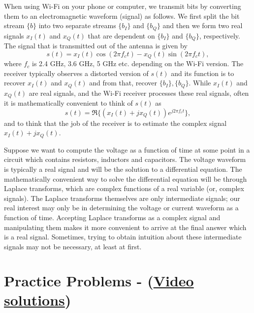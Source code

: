 \begin{example}
When using Wi-Fi on your phone or computer, we transmit bits by converting them
to an electromagnetic waveform (signal) as follows.
We first split the bit stream $\{b\}$ into two separate streams $\{b_I\}$ and $\{b_Q\}$ and then we form two real signals
$x_I(t)$ and $x_Q(t)$ that are dependent on $\{b_I\}$ and $\{b_Q\}$, respectively.
The signal that is transmitted out of the antenna is given by
\[
s(t) = x_I(t) \cos(2 \pi f_c t) - x_Q(t) \sin (2 \pi f_c t),
\]
where $f_c$ is 2.4 GHz, 3.6 GHz, 5 GHz etc. depending on the Wi-Fi version.
The receiver typically observes a distorted version of $s(t)$ and its function is to recover $x_I(t)$ and $x_Q(t)$
and from that, recover $\{b_I\}, \{b_Q\}$.
While $x_I(t)$ and $x_Q(t)$ are real signals,
and the Wi-Fi receiver processes these real signals,
often it is mathematically convenient to think of $s(t)$ as
\[
s(t) = \Re\{(x_I(t)+jx_Q(t)) e^{j 2 \pi f_c t} \},
\]
and to think that the job of the receiver is to estimate the complex signal $x_I(t)+jx_Q(t)$.
\end{example}


\begin{example}
Suppose we want to compute the voltage as a function of time at some point in a circuit which contains resistors, inductors and capacitors.
The voltage waveform is typically a real signal and will be the solution to a differential equation.
The mathematically convenient way to solve the differential equation will be through Laplace transforms, which are complex functions of a real variable (or, complex signals).
The Laplace transforms themselves are only intermediate signals; our real interest may only be in determining the voltage or current waveform as a function of time.
Accepting Laplace transforms as a complex signal and manipulating them makes it more convenient to arrive at the final answer which is a real signal.
Sometimes, trying to obtain intuition about these intermediate signals may not be necessary, at least at first.
\end{example}

\section{Practice Problems -
(\href{http://signalsandsystems.wikidot.com/problems-complex-numbers}{Video solutions})}

